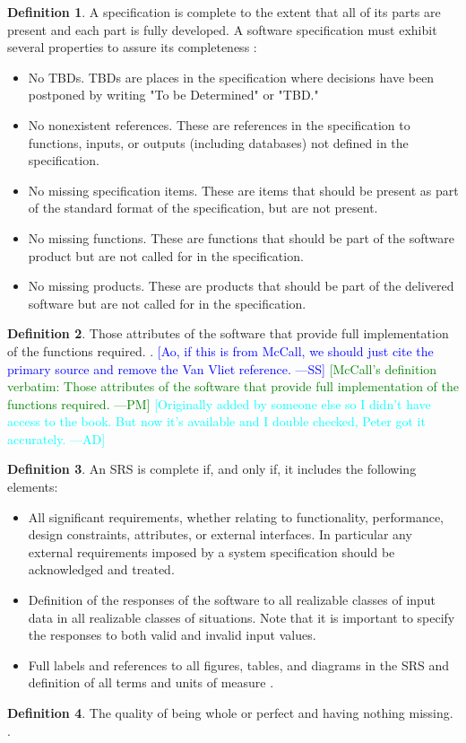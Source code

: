 \documentclass[letterpaper,cleveref]{lipics-v2019}
\newcommand{\authornote}[3]{\textcolor{#1}{[#3 ---#2]}}
\newcommand{\authornote}[3]{}
\newcommand{\wss}[1]{\authornote{blue}{SS}{#1}} %
\newcommand{\pmi}[1]{\authornote{green}{PM}{#1}} %
\newcommand{\ad}[1]{\authornote{cyan}{AD}{#1}} %
\theoremstyle{definition}
\newtheorem{defn}{Definition}
\begin{document}
\begin{defn}
  \label{CompletenessSelected}
  A specification is complete to the extent that all of its parts are present
  and each part is fully developed. A software specification must exhibit
  several properties to assure its completeness \citep{Boehm1984}:
  \begin{itemize}
  \item No TBDs. TBDs are places in the specification where decisions have been
    postponed by writing "To be Determined" or "TBD."
  \item No nonexistent references. These are references in the specification to
    functions, inputs, or outputs (including databases) not defined in the
    specification.
  \item No missing specification items. These are items that should be present
    as part of the standard format of the specification, but are not present.
  \item No missing functions. These are functions that should be part of the
    software product but are not called for in the specification.
  \item No missing products. These are products that should be part of the
    delivered software but are not called for in the specification.
  \end{itemize}
\end{defn}

\begin{defn}
  Those attributes of the software that provide full implementation of the 
  functions required. \citep{McCallEtAl1977}. \wss{Ao, if this is from McCall, 
  we should just cite the primary source and remove the Van Vliet reference.} 
  \pmi{McCall's definition verbatim: Those attributes of the software that 
  provide full implementation of the functions required.} \ad{Originally added 
  by someone else so I didn't have access to the book. But now it's available 
  and I double checked, Peter got it accurately.}
\end{defn}

\begin{defn}
	An SRS is complete if, and only if, it includes the following elements:
\begin{itemize}
\item All significant requirements, whether relating to functionality,
performance, design constraints, attributes, or external interfaces. In
particular any external requirements imposed by a system specification should be
acknowledged and treated.
\item Definition of the responses of the software to all realizable classes of
input data in all realizable classes of situations. Note that it is important to
specify the responses to both valid and invalid input values.
\item Full labels and references to all figures, tables, and diagrams in the SRS
and definition of all terms and units of measure \citep{IEEE1998}.
	\end{itemize}
\end{defn}
\begin{defn}
The quality of being whole or perfect and having nothing missing.
\citep{CambridgeCompleteness2019}.
\end{defn}
\end{document}
